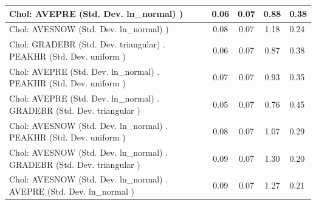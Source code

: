 \begin{table}
\begin{center}
\begin{tabular}{|l|l|c|c|c|l|}
			\hline
			 Chol: AVEPRE (Std. Dev. ln_normal) ) &  & 0.06 & 0.07 & 0.88 & 0.38 \\
			\hline
			 Chol: AVESNOW (Std. Dev. ln_normal) ) &  & 0.08 & 0.07 & 1.18 & 0.24 \\
			\hline
			 Chol: GRADEBR (Std. Dev. triangular) . PEAKHR (Std. Dev.   uniform ) &  & 0.06 & 0.07 & 0.87 & 0.38 \\
			\hline
			 Chol: AVEPRE (Std. Dev. ln_normal) . PEAKHR (Std. Dev.   uniform ) &  & 0.07 & 0.07 & 0.93 & 0.35 \\
			\hline
			 Chol: AVEPRE (Std. Dev. ln_normal) . GRADEBR (Std. Dev.   triangular ) &  & 0.05 & 0.07 & 0.76 & 0.45 \\
			\hline
			 Chol: AVESNOW (Std. Dev. ln_normal) . PEAKHR (Std. Dev.   uniform ) &  & 0.08 & 0.07 & 1.07 & 0.29 \\
			\hline
			 Chol: AVESNOW (Std. Dev. ln_normal) . GRADEBR (Std. Dev.   triangular ) &  & 0.09 & 0.07 & 1.30 & 0.20 \\
			\hline
			 Chol: AVESNOW (Std. Dev. ln_normal) . AVEPRE (Std. Dev.   ln_normal ) &  & 0.09 & 0.07 & 1.27 & 0.21 \\
			\hline
		\end{tabular}
	\end{center}
\end{table}